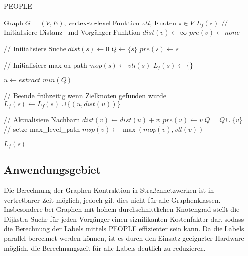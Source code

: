 \begin{algorithm}[p]
  \caption{PEOPLE}
  \begin{algorithmic}[1]
    \Require Graph $G = (V, E)$, vertex-to-level Funktion ${vtl}$, Knoten $s \in V$
    \Ensure $L_f (s)$
    \State // Initialisiere Distanz- und Vorgänger-Funktion
    \State ${dist}(v) \leftarrow \infty$
    \State ${pre}(v) \leftarrow {none}$
    \EndFor

    \State
    \State // Initialisiere Suche
    \State ${dist}(s) \leftarrow 0$
    \State $Q\leftarrow \{ s \}$
    \State ${pre}(s) \leftarrow s$

    \State
    \State // Initialisiere max-on-path
    \State ${mop}(s) \leftarrow {vtl}(s)$
    \State $L_f (s) \leftarrow \{ \}$

    \State
    \State $u \leftarrow{extract\_min}(Q)$\label{graphs:dijkstra:pop}

    \State
    \State // Beende frühzeitig wenn Zielknoten gefunden wurde
    \State $L_f (s) \leftarrow L_f (s) \cup \{ (u, {dist}(u)) \}$
    \EndIf

    \State
    \State // Aktualisiere Nachbarn
    \State ${dist}(v) \leftarrow {dist}(u) + w$
    \State ${pre}(u) \leftarrow v$
    \State $Q = Q \cup \{ v \}$
    \State
    \State // setze max\_level\_path
    \State ${mop}(v) \leftarrow \max({mop}(v), {vtl}(v))$
    \EndIf
    \EndFor

    \EndWhile

    \State
    \State \Return $L_f (s)$
  \end{algorithmic}
  \label{alg:people:people}
\end{algorithm}

\subsection{Anwendungsgebiet}

Die Berechnung der Graphen-Kontraktion in Straßennetzwerken ist in vertretbarer Zeit möglich, jedoch gilt dies nicht für alle Graphenklassen. Insbesondere bei Graphen mit hohem durchschnittlichen Knotengrad stellt die Dijkstra-Suche für jeden Vorgänger einen signifikanten Kostenfaktor dar, sodass die Berechnung der Labels mittels PEOPLE effizienter sein kann.
Da die Labels parallel berechnet werden können, ist es durch den Einsatz geeigneter Hardware möglich, die Berechnungszeit für alle Labels deutlich zu reduzieren.

